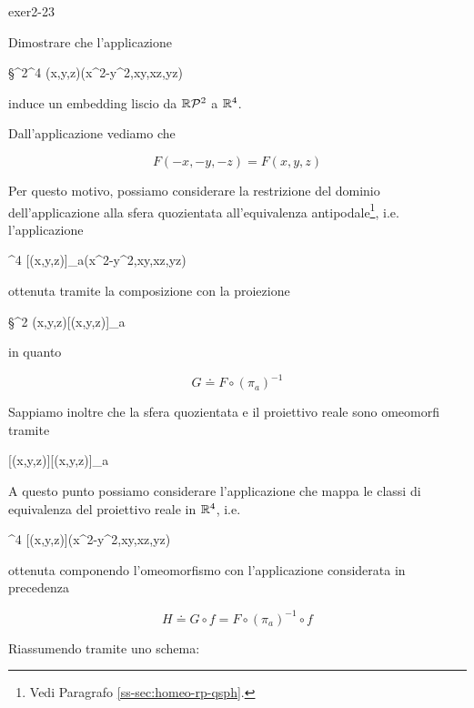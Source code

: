 {exer2-23}
{
Dimostrare che l'applicazione

	{\S^{2}}{\R^{4}}
	{(x,y,z)}{(x^{2}-y^{2},xy,xz,yz)}

induce un embedding liscio da $ \mathbb{R}\mathcal{P}^{2} $ a $ \mathbb{R}^{4} $.
}
{
Dall'applicazione vediamo che

\begin{equation}
	F(-x,-y,-z) = F(x,y,z)
\end{equation}

Per questo motivo, possiamo considerare la restrizione del dominio dell'applicazione alla sfera quozientata all'equivalenza antipodale\footnote{%
	Vedi Paragrafo \ref{ss-sec:homeo-rp-qsph}.%
}, i.e. l'applicazione

	{}{\R^{4}}
	{[(x,y,z)]_{a}}{(x^{2}-y^{2},xy,xz,yz)}

ottenuta tramite la composizione con la proiezione

	{\S^{2}}{}
	{(x,y,z)}{[(x,y,z)]_{a}}

in quanto

\begin{equation}
	G \doteq F \circ (\pi_{a})^{-1}
\end{equation}

Sappiamo inoltre che la sfera quozientata e il proiettivo reale sono omeomorfi tramite

	{}{}
	{[(x,y,z)]}{[(x,y,z)]_{a}}

A questo punto possiamo considerare l'applicazione che mappa le classi di equivalenza del proiettivo reale in $ \mathbb{R}^{4} $, i.e.

	{}{\R^{4}}
	{[(x,y,z)]}{(x^{2}-y^{2},xy,xz,yz)}

ottenuta componendo l'omeomorfismo con l'applicazione considerata in precedenza

\begin{equation}
	H \doteq G \circ f = F \circ (\pi_{a})^{-1} \circ f
\end{equation}

Riassumendo tramite uno schema:


}
